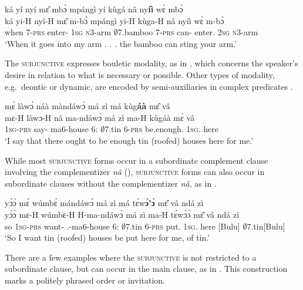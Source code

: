 \ea\label{SBJVa}
  \glll    ká yí nyí mɛ̂ mbɔ̀ mpángì yí kùgá nâ ny{\bfseries íì} wɛ̀ mbɔ̀\\
           ká yi-H nyî-H mɛ̂ m-bɔ̀ mpángì yi-H kùga-H nâ nyíì wɛ̀ m-bɔ̀ \\
             when 7-\textsc{prs} enter-{\R} 1\textsc{sg} \textsc{n}3-arm $\emptyset$7.bamboo 7-\textsc{prs} can-{\R} {\COMP} enter.{\SBJV} 2\textsc{sg} \textsc{n}3-arm\\
    \trans `When it goes into my arm . . . the bamboo can sting your arm.'
\z

The \textsc{subjunctive} expresses bouletic modality, as in , which concerns the speaker's desire in relation to what is necessary or possible. Other types of modality, e.g.\ deontic or dynamic, are encoded by semi-auxiliaries in complex predicates .

\ea\label{Bouletic}
  \glll  mɛ́ làwɔ́ náà màndáwɔ̀ má zì má kùg{\bfseries áà} mɛ̂ vâ\\
         mɛ-H làwɔ-H nâ ma-ndáwɔ̀ má zì ma-H kùgáà mɛ̀ vâ \\
            1\textsc{sg}-\textsc{prs} say-{\R} {\COMP} ma6-house 6:{\ATT} $\emptyset$7.tin 6-\textsc{prs} be.enough.{\SBJV} 1\textsc{sg}.{\OBJ} here\\
    \trans `I say that there ought to be enough tin (roofed) houses here for me.'
\z


\noindent While most \textsc{subjunctive} forms occur in a subordinate complement clause involving the complementizer {\itshape nâ} (), \textsc{subjunctive} forms can also occur  in subordinate clauses without the complementizer {\itshape nâ}, as in .

\ea\label{SBJVc}
  \glll     yɔ́ɔ̀ mɛ́ wúmbɛ́ mándáwɔ̀ má zì má tɛ́w{\bfseries ɔ́'ɔ̀} mɛ̂ vâ ndá zì \\
            yɔ́ɔ̀ mɛ-H wúmbɛ-H H-ma-ndáwɔ̀ má zì ma-H tɛ́wɔ̀ɔ̀ mɛ̂ vâ ndá zì \\
              so 1\textsc{sg}-\textsc{prs} want-{\R} {\OBJ}.{\LINK}-ma6-house 6:{\ATT} $\emptyset$7.tin 6-\textsc{prs} put.{\SBJV} 1\textsc{sg}.{\OBJ} here {\ATT}[Bulu] $\emptyset$7.tin[Bulu]\\
    \trans `So I want tin (roofed) houses be put here for me, of tin.'
\z

There are a few examples where the \textsc{subjunctive} is not restricted to a subordinate clause, but can occur in the main clause, as in . This construction marks a politely phrased order or invitation.

